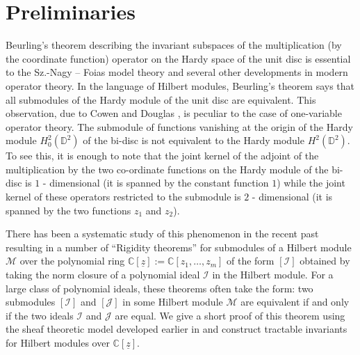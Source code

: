 \documentclass[11pt]{amsart}
\theoremstyle{definition}
\numberwithin{equation}{section}
\begin{document}
\section{Preliminaries}\label{intro}
Beurling's theorem describing the invariant subspaces of the multiplication (by the coordinate function) operator on the Hardy space of the unit disc is essential to the Sz.-Nagy -- Foias model theory and several other developments in modern operator theory.  In the language of Hilbert modules,  Beurling's theorem says that all submodules of the Hardy module of the unit disc are equivalent.  This observation, due to Cowen and Douglas \cite{cd2}, is peculiar to the case of one-variable operator theory. The submodule of functions vanishing at the origin of the Hardy module $H_0^2(\mathbb D^2)$ of the bi-disc is not equivalent to the Hardy module $H^2(\mathbb D^2)$.
To see this, it is enough to note that the joint kernel of the adjoint of the multiplication by the two co-ordinate functions on the Hardy module of the bi-disc  is $1$ - dimensional (it is spanned by the constant function $1$) while the joint kernel of these operators restricted to the submodule is $2$ - dimensional (it is spanned by the two functions $z_1$ and $z_2$).

There has been a systematic study of this phenomenon in the recent past \cite{as,dpsy} resulting in a number of ``Rigidity theorems'' for submodules of a Hilbert module $\mathcal M$ over the polynomial ring ${{\mathbb C}}[\underline z]:={{\mathbb C}}[z_1,\ldots,z_m]$ of the form $[\mathcal I]$ obtained by taking the norm closure of a polynomial ideal $\mathcal I$ in the Hilbert module. For a large class of polynomial ideals, these theorems often take the form: two submodules $[\mathcal I]$ and $[\mathcal J]$ in some Hilbert module $\mathcal M$ are equivalent if and only if the two ideals $\mathcal I$ and $\mathcal J$ are equal. We give a short proof of this
theorem  using the sheaf theoretic model developed earlier in \cite{bmp} and construct tractable invariants for Hilbert modules over ${{\mathbb C}}[\underline z]$.
\end{document}
